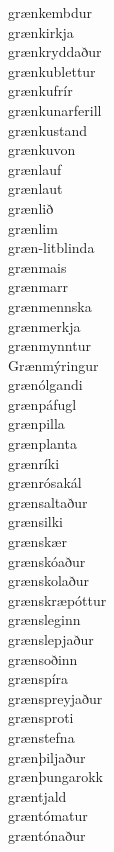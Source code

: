 \documentclass[../samsetningasafn.tex]{subfiles}
\begin{document}
\begin{bigwordlist}
\begin{footnotesize}
\begin{multicols}{4}
\begin{description}
		\item [grænkembdur]
		\item [grænkirkja]
		\item [grænkryddaður]
		\item [grænkublettur]
		\item [grænkufrír]
		\item [grænkunarferill]
		\item [grænkustand]
		\item [grænkuvon]
		\item [grænlauf]
		\item [grænlaut]
		\item [grænlið]
		\item [grænlim]
		\item [græn-litblinda]
		\item [grænmais]
		\item [grænmarr]
		\item [grænmennska]
		\item [grænmerkja]
		\item [grænmynntur]
		\item [Grænmýringur]
		\item [grænólgandi]
		\item [grænpáfugl]
		\item [grænpilla]
		\item [grænplanta]
		\item [grænríki]
		\item [grænrósakál]
		\item [grænsaltaður]
		\item [grænsilki]
		\item [grænskær]
		\item [grænskóaður]
		\item [grænskolaður]
		\item [grænskræpóttur]
		\item [grænsleginn]
		\item [grænslepjaður]
		\item [grænsoðinn]
		\item [grænspíra]
		\item [grænspreyjaður]
		\item [grænsproti]
		\item [grænstefna]
		\item [grænþiljaður]
		\item [grænþungarokk]
		\item [græntjald]
		\item [græntómatur]
		\item [græntónaður]

\end{description}
\end{multicols}
\end{footnotesize}
\end{bigwordlist}
\end{document}

